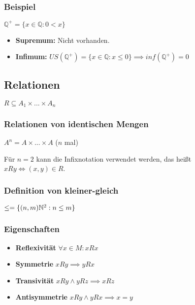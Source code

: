 \documentclass[12pt]{scrreprt}
\begin{document}
                \subsubsection{Beispiel}
                    $ \mathbb{Q} ^ \mathsf{+} = \{ x \in \mathbb{Q} : 0 < x \} $

                    \begin{itemize}
                        \item \textbf{Supremum:} Nicht vorhanden.
                        \item \textbf{Infimum:} $ US(\mathbb{Q} ^ \mathsf{+}) = \{ x \in \mathbb{Q} : x \leq 0 \} \implies inf(\mathbb{Q} ^ \mathsf{+}) = 0 $
                    \end{itemize}


            \subsection{Relationen}
                $ R \subseteq A _ 1 \times ... \times A _ n $

                \subsubsection{Relationen von identischen Mengen}

                    $ A ^ n = A \times ... \times A $ ($ n $ mal)

                    Für $ n = 2 $ kann die Infixnotation verwendet werden, das heißt $ xRy \iff (x, y) \in R $.


                \subsubsection{Definition von kleiner-gleich}

                    $ \leq = \{ (n, m) \if \mathbb{N} ^ 2 : n \leq m \} $


                \subsubsection{Eigenschaften}
                    \begin{itemize}
                        \item \textbf{Reflexivität} $ \forall x \in M : xRx $
                        \item \textbf{Symmetrie} $ xRy \implies yRx $
                        \item \textbf{Transivität} $ xRy \land yRz \implies xRz $
                        \item \textbf{Antisymmetrie} $ xRy \land yRx \implies x = y $
                    \end{itemize}
\end{document}

